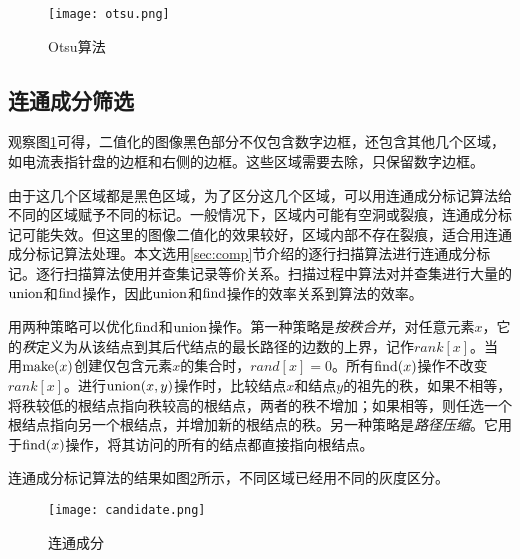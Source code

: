 \begin{figure}[h]
  \centering
  \texttt{[image: otsu.png]}
  \caption{Otsu算法}
  \label{fig:otsu}
\end{figure}

\subsection{连通成分筛选}

观察图\ref{fig:otsu}可得，二值化的图像黑色部分不仅包含数字边框，还包含其他几个区域，如电流表指针盘的边框和右侧的边框。这些区域需要去除，只保留数字边框。


由于这几个区域都是黑色区域，为了区分这几个区域，可以用连通成分标记算法给不同的区域赋予不同的标记。一般情况下，区域内可能有空洞或裂痕，连通成分标记可能失效。但这里的图像二值化的效果较好，区域内部不存在裂痕，适合用连通成分标记算法处理。本文选用\ref{sec:comp}节介绍的逐行扫描算法进行连通成分标记。逐行扫描算法使用并查集记录等价关系。扫描过程中算法对并查集进行大量的$\operatorname{union}$和$\operatorname{find}$操作，因此$\operatorname{union}$和$\operatorname{find}$操作的效率关系到算法的效率。

用两种策略可以优化$\operatorname{find}$和$\operatorname{union}$操作。第一种策略是\emph{按秩合并}，对任意元素$x$，它的\emph{秩}定义为从该结点到其后代结点的最长路径的边数的上界，记作$rank[x]$。当用$\operatorname{make}(x)$创建仅包含元素$x$的集合时，$rand[x]=0$。所有$\operatorname{find}(x)$操作不改变$rank[x]$。进行$\operatorname{union}(x,y)$操作时，比较结点$x$和结点$y$的祖先的秩，如果不相等，将秩较低的根结点指向秩较高的根结点，两者的秩不增加；如果相等，则任选一个根结点指向另一个根结点，并增加新的根结点的秩。另一种策略是\emph{路径压缩}。它用于$\operatorname{find}(x)$操作，将其访问的所有的结点都直接指向根结点。


连通成分标记算法的结果如图\ref{fig:candidate}所示，不同区域已经用不同的灰度区分。
\begin{figure}[h]
  \centering
  \texttt{[image: candidate.png]}
  \caption{连通成分}
  \label{fig:candidate}
\end{figure}


